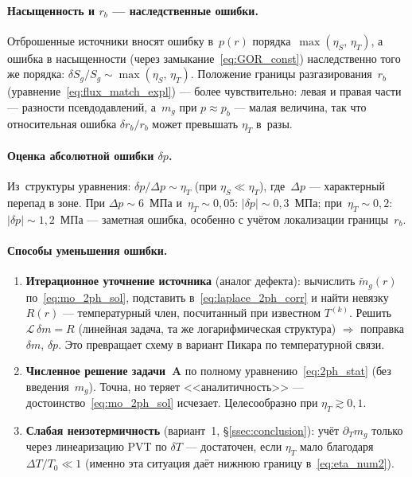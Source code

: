 ﻿\documentclass[12pt,a4paper]{article}
\begin{document}
\paragraph{Насыщенность и $r_b$ --- наследственные ошибки.}
Отброшенные источники вносят ошибку в~$p(r)$
порядка~$\max(\eta_S,\,\eta_T)$, а ошибка в насыщенности
(через замыкание~\eqref{eq:GOR_const}) наследственно
того же порядка: $\delta S_g / S_g \sim \max(\eta_S,\,\eta_T)$.
Положение границы разгазирования~$r_b$
(уравнение~\eqref{eq:flux_match_expl}) --- более
чувствительно: левая и правая части --- разности
псевдодавлений, а~$m_g$ при $p \approx p_b$ --- малая
величина, так что относительная ошибка $\delta r_b / r_b$
может превышать $\eta_T$ в~разы.

\paragraph{Оценка абсолютной ошибки $\delta p$.}
Из~структуры уравнения: $\delta p / \Delta p \sim \eta_T$
(при $\eta_S \ll \eta_T$),
где~$\Delta p$ --- характерный перепад в зоне. При
$\Delta p \sim 6$~МПа и~$\eta_T \sim 0{,}05$: $|\delta p|
\sim 0{,}3$~МПа; при~$\eta_T \sim 0{,}2$: $|\delta p|
\sim 1{,}2$~МПа --- заметная ошибка, особенно с учётом
локализации границы~$r_b$.

\paragraph{Способы уменьшения ошибки.}
\begin{enumerate}[nosep]
  \item \textbf{Итерационное уточнение источника}
        (аналог дефекта): вычислить
        $\tilde m_g(r)$ по~\eqref{eq:mo_2ph_sol},
        подставить в~\eqref{eq:laplace_2ph_corr}
        и найти невязку $R(r)$ --- температурный
        член, посчитанный при известном $T^{(k)}$.
        Решить $\mathcal L\,\delta m = R$ (линейная
        задача, та же логарифмическая структура)
        $\Rightarrow$ поправка $\delta m$, $\delta p$.
        Это превращает схему в вариант Пикара
        по температурной связи.
  \item \textbf{Численное решение задачи~A}
        по полному уравнению~\eqref{eq:2ph_stat}
        (без введения~$m_g$). Точна, но теряет
        <<аналитичность>> --- достоинство~\eqref{eq:mo_2ph_sol}
        исчезает. Целесообразно при $\eta_T \gtrsim 0{,}1$.
  \item \textbf{Слабая неизотермичность} (вариант~1,
        \S\ref{ssec:conclusion}): учёт $\partial_T m_g$
        только через линеаризацию PVT по $\delta T$ ---
        достаточен, если $\eta_T$ мало благодаря
        $\Delta T / T_0 \ll 1$ (именно эта ситуация
        даёт нижнюю границу в~\eqref{eq:eta_num2}).
\end{enumerate}
\end{document}
